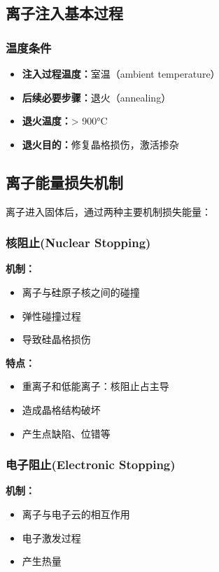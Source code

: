 \documentclass[UTF8,12pt,a4paper]{ctexart}
\begin{document}
\subsection{离子注入基本过程}

\subsubsection{温度条件}

\begin{itemize}
    \item \textbf{注入过程温度：}室温（ambient temperature）
    \item \textbf{后续必要步骤：}退火（annealing）
    \item \textbf{退火温度：}> 900°C
    \item \textbf{退火目的：}修复晶格损伤，激活掺杂
\end{itemize}

\subsection{离子能量损失机制}

离子进入固体后，通过两种主要机制损失能量：

\subsubsection{核阻止(Nuclear Stopping)}

\textbf{机制：}
\begin{itemize}
    \item 离子与硅原子核之间的碰撞
    \item 弹性碰撞过程
    \item 导致硅晶格损伤
\end{itemize}

\textbf{特点：}
\begin{itemize}
    \item 重离子和低能离子：核阻止占主导
    \item 造成晶格结构破坏
    \item 产生点缺陷、位错等
\end{itemize}

\subsubsection{电子阻止(Electronic Stopping)}

\textbf{机制：}
\begin{itemize}
    \item 离子与电子云的相互作用
    \item 电子激发过程
    \item 产生热量
\end{itemize}
\end{document}
